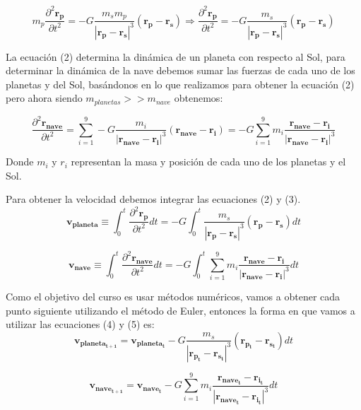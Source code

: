 \documentclass[12pt,letterpaper]{article}
\begin{document}
\begin{equation}
 m_p\dfrac{\partial ^2 \mathbf{r_p}}{\partial t^2}=-G\dfrac{m_sm_p}{|\mathbf{r_{p}}-\mathbf{r_s}|^3}(\mathbf{r_{p}}-\mathbf{r_s}) \Rightarrow \dfrac{\partial ^2 \mathbf{r_p}}{\partial t^2}=-G\dfrac{m_s}{|\mathbf{r_{p}}-\mathbf{r_s}|^3}(\mathbf{r_{p}}-\mathbf{r_s})
\end{equation} 

La ecuación (2) determina la dinámica de un planeta con respecto al Sol, para determinar la dinámica de la nave debemos sumar las fuerzas de cada uno de los planetas y del Sol, basándonos en lo que realizamos para obtener la ecuación (2) pero ahora siendo $m_{planetas}>>m_{nave}$ obtenemos:

\begin{equation}
\dfrac{\partial ^2 \mathbf{r_{nave}}}{\partial t^2}=\sum_{i=1}^{9} -G\dfrac{m_i}{|\mathbf{r_{nave}}-\mathbf{r_i}|^3}(\mathbf{r_{nave}}-\mathbf{r_i})=-G \sum_{i=1}^{9} m_ i\dfrac{\mathbf{r_{nave}}-\mathbf{r_i}}{|\mathbf{r_{nave}}-\mathbf{r_i}|^3}
\end{equation}

Donde $m_i$ y $r_i$ representan la masa y posición de cada uno de los planetas y el Sol.

Para obtener la velocidad debemos integrar las ecuaciones (2) y (3).
\begin{equation}
\mathbf{v_{planeta}}\equiv\int_{0}^{t} \dfrac{\partial ^2 \mathbf{r_p}}{\partial t^2} dt=-G \int_{0}^{t} \dfrac{m_s}{|\mathbf{r_{p}}-\mathbf{r_s}|^3}(\mathbf{r_{p}}-\mathbf{r_s}) dt
\end{equation}

\begin{equation}
\mathbf{v_{nave}}\equiv\int_{0}^{t} \dfrac{\partial ^2 \mathbf{r_{nave}}}{\partial t^2} dt=-G \int_{0}^{t} \sum_{i=1}^{9} m_ i\dfrac{\mathbf{r_{nave}}-\mathbf{r_i}}{|\mathbf{r_{nave}}-\mathbf{r_i}|^3} dt
\end{equation}

Como el objetivo del curso es usar métodos numéricos, vamos a obtener cada punto siguiente utilizando el método de Euler, entonces la forma en que vamos a utilizar las ecuaciones (4) y (5) es:
\begin{equation}
\mathbf{v_{planeta_{t+1}}}=\mathbf{v_{planeta_t}}-G\dfrac{m_s}{|\mathbf{r_{p_t}}-\mathbf{r_{s_t}}|^3}(\mathbf{r_{p_t}}-\mathbf{r_{s_t}})dt
\end{equation}

\begin{equation}
\mathbf{v_{nave_{t+1}}}=\mathbf{v_{nave_t}}-G \sum_{i=1}^{9} m_ i\dfrac{\mathbf{r_{nave_t}}-\mathbf{r_{i_t}}}{|\mathbf{r_{nave_t}}-\mathbf{r_{i_t}}|^3}dt
\end{equation}
\end{document}
